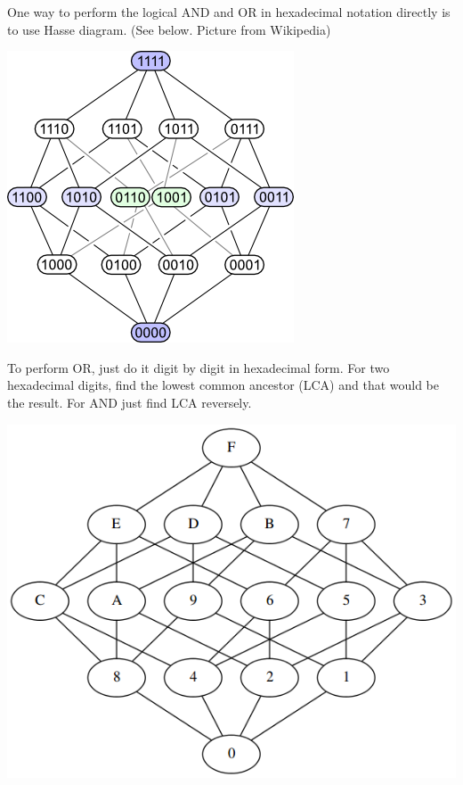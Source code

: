 \documentclass[a4paper]{article}
\begin{document}
\begin{enumerate}
  One way to perform the logical AND and OR in hexadecimal notation
  directly is to use Hasse diagram. (See below. Picture from
  Wikipedia)

  \begin{center}
    \includegraphics[scale=0.5]{hasse.png}
  \end{center}

  To perform OR, just do it digit by digit in hexadecimal form. For
  two hexadecimal digits, find the lowest common ancestor (LCA) and
  that would be the result. For AND just find LCA reversely.
  
  \begin{center}
    \includegraphics[scale=0.3]{hex_hasse.png}
  \end{center}


\end{enumerate}
\end{document}
